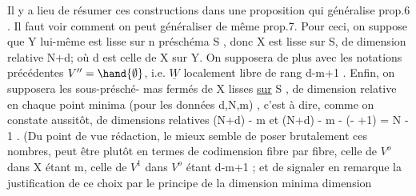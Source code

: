 Il y a lieu de résumer ces constructions dans une proposition
qui généralise prop.6 . Il faut voir comment on peut généraliser de même
prop.7. Pour ceci, on suppose que Y lui-même est lisse sur n préschéma
S ,  donc X est lisse sur S, de dimension relative N+d\unsure{$^{\ast}$}; où d est celle de X
sur Y. On supposera de plus avec les notations précédentes $V''=\hand{\emptyset}$, i.e.
$\underline{W}$ localement libre de rang d-m+1 . Enfin, on supposera les sous-présché-%
mas fermés   de X lisses \uline{sur} S , de dimension relative  en chaque
point minima (pour les données d,N,m) ,  c'est à dire, comme
on constate aussitôt, de dimensions relatives (N+d) - m et
(N+d) - m - (- +1) = N - 1 . (Du point de vue rédaction, le mieux
semble de poser brutalement ces nombres, peut être plutôt en termes
de codimension fibre par fibre, celle de $V^o$ dans X étant m, celle de
$V^1$ dans $V^o$ étant d-m+1 ; et de signaler en remarque la justification
de ce choix par le principe de la dimension minima  dimension 

